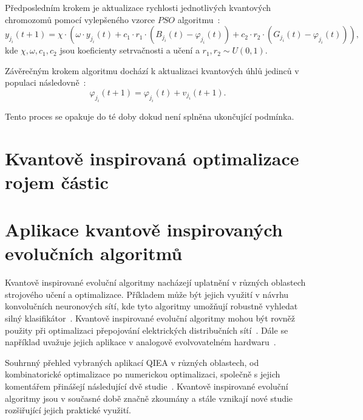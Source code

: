 Předposledním krokem je aktualizace rychlosti jednotlivých kvantových chromozomů pomocí vylepšeného vzorce $PSO$ algoritmu~\cite{qse}: 
\begin{equation*}
    y_{j_i}\left(t+1\right) = \chi \cdot
    \left( \omega \cdot y_{j_i}\left(t\right) 
        + c_1 \cdot r_1 \cdot \left(B_{j_i}\left(t\right) - \varphi_{j_i}\left(t\right) \right)
        + c_2 \cdot r_2 \cdot \left( G_{j_i}\left(t\right) - \varphi_{j_i}\left(t\right) \right)\right),
\end{equation*}
kde $\chi, \omega, c_1 , c_2$ jsou koeficienty setrvačnosti a učení a $r_1,r_2\sim U(0,1)$.  

Závěrečným krokem algoritmu dochází k aktualizaci kvantových úhlů jedinců v populaci následovně~\cite{qse}:
\begin{equation*}
    \varphi_{j_i}\left(t+1\right) = \varphi_{j_i}\left(t\right) + v_{j_i}\left(t+1\right).
\end{equation*}

Tento proces se opakuje do té doby dokud není splněna ukončující podmínka.

\section{Kvantově inspirovaná optimalizace rojem částic}

\section{Aplikace kvantově inspirovaných evolučních algoritmů}
Kvantově inspirované evoluční algoritmy nacházejí uplatnění v různých oblastech strojového učení a optimalizace. 
Příkladem může být jejich využití v návrhu konvolučních neuronových sítí, kde tyto algoritmy umožňují robustně vyhledat silný klasifikátor~\cite{QIEA-CNN}. 
Kvantově inspirované evoluční algoritmy mohou být rovněž použity při optimalizaci přepojování elektrických distribučních sítí~\cite{QIEA-net}. 
Dále se například uvažuje jejich aplikace v analogově evolvovatelném hardwaru~\cite{QIEA-EHW}. 

Souhrnný přehled vybraných aplikací QIEA v různých oblastech, od kombinatorické optimalizace po numerickou optimalizaci, společně s jejich komentářem přinášejí následující dvě studie~\cite{QIEA-survey1, QIEA-survey2}. 
Kvantově inspirované evoluční algoritmy jsou v současné době značně zkoumány a stále vznikají nové studie rozšiřující jejich praktické využití. 
